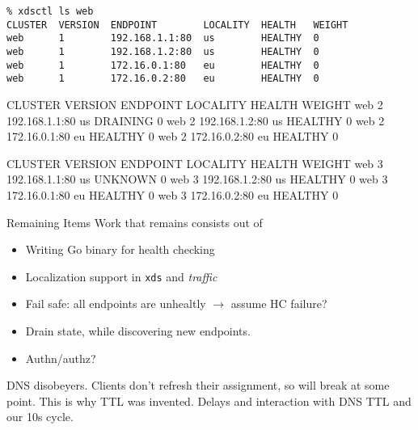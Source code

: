 \documentclass[aspectratio=169]{beamer}
\begin{document}
    \begin{frame}[fragile]
        \begin{verbatim}
% xdsctl ls web
CLUSTER  VERSION  ENDPOINT        LOCALITY  HEALTH   WEIGHT
web      1        192.168.1.1:80  us        HEALTHY  0
web      1        192.168.1.2:80  us        HEALTHY  0
web      1        172.16.0.1:80   eu        HEALTHY  0
web      1        172.16.0.2:80   eu        HEALTHY  0
        \end{verbatim}

    \end{frame}

    \begin{frame}[fragile]

        \begin{verbbox}
CLUSTER  VERSION  ENDPOINT        LOCALITY  HEALTH    WEIGHT
web      2        192.168.1.1:80  us        DRAINING  0
web      2        192.168.1.2:80  us        HEALTHY   0
web      2        172.16.0.1:80   eu        HEALTHY   0
web      2        172.16.0.2:80   eu        HEALTHY   0
        \end{verbbox}

    \end{frame}

    \begin{frame}[fragile]

        \begin{verbbox}
CLUSTER  VERSION  ENDPOINT        LOCALITY  HEALTH   WEIGHT
web      3        192.168.1.1:80  us        UNKNOWN  0
web      3        192.168.1.2:80  us        HEALTHY  0
web      3        172.16.0.1:80   eu        HEALTHY  0
web      3        172.16.0.2:80   eu        HEALTHY  0
        \end{verbbox}

    \end{frame}

    \begin{frame}{Remaining Items}
        Work that remains consists out of
        \begin{itemize}
            \item Writing Go binary for health checking
            \item Localization support in \texttt{xds} and \emph{traffic}
            \item Fail safe: all endpoints are unhealtly $\rightarrow$ assume HC failure?
            \item Drain state, while discovering new endpoints.
            \item Authn/authz?
        \end{itemize}

        DNS disobeyers. Clients don't refresh their assignment, so will break at some point.
        This is why TTL was invented.
        Delays and interaction with DNS TTL and our 10s cycle.
    \end{frame}
\end{document}
